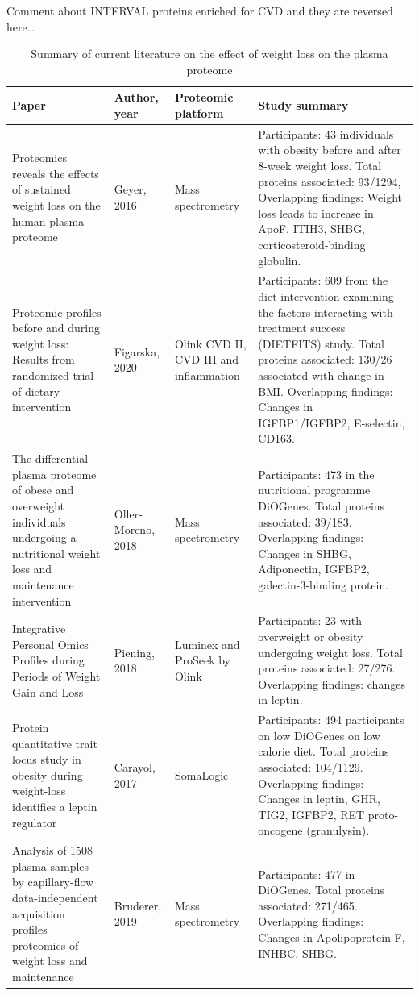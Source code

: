 \documentclass[11pt,twoside]{bristolthesis}
\begin{document}
Comment about INTERVAL proteins enriched for CVD and they are reversed here\ldots{}
\begin{landscape}\begin{table}

\caption{\label{tab:weight-loss-protein}Summary of current literature on the effect of weight loss on the plasma proteome}
\centering
\begin{tabu} to 
\toprule
Paper & Author, year & Proteomic platform & Study summary\\
\midrule
Proteomics reveals the effects of sustained weight loss on the human plasma proteome & Geyer, 2016 & Mass spectrometry & Participants: 43 individuals with obesity before and after 8-week weight loss.
Total proteins associated: 93/1294,
Overlapping findings: Weight loss leads to increase in ApoF, ITIH3, SHBG, corticosteroid-binding globulin.\\
Proteomic profiles before and during weight loss: Results from randomized trial of dietary intervention & Figarska, 2020 & Olink CVD II, CVD III and inflammation & Participants: 609 from the diet intervention examining the factors interacting with treatment success (DIETFITS) study.
Total proteins associated: 130/26 associated with change in BMI.
Overlapping findings: Changes in IGFBP1/IGFBP2, E-selectin, CD163.\\
The differential plasma proteome of obese and overweight individuals undergoing a nutritional weight loss and maintenance intervention & Oller-Moreno, 2018 & Mass spectrometry & Participants: 473 in the nutritional programme DiOGenes.
Total proteins associated: 39/183.
Overlapping findings: Changes in SHBG, Adiponectin, IGFBP2, galectin-3-binding protein.\\
Integrative Personal Omics Profiles during Periods of Weight Gain and Loss & Piening, 2018 & Luminex and ProSeek by Olink & Participants: 23 with overweight or obesity undergoing weight loss.
Total proteins associated: 27/276.
Overlapping findings: changes in leptin.\\
Protein quantitative trait locus study in obesity during weight-loss identifies a leptin regulator & Carayol, 2017 & SomaLogic & Participants: 494 participants on low DiOGenes on low calorie diet.
Total proteins associated: 104/1129.
Overlapping findings: Changes in leptin, GHR, TIG2, IGFBP2, RET proto-oncogene (granulysin).\\
\addlinespace
Analysis of 1508 plasma samples by capillary-flow data-independent acquisition profiles proteomics of weight loss and maintenance & Bruderer, 2019 & Mass spectrometry & Participants: 477 in DiOGenes.
Total proteins associated: 271/465.
Overlapping findings: Changes in Apolipoprotein F, INHBC, SHBG.\\
\bottomrule
\end{tabu}
\end{table}
\end{landscape}
\end{document}
